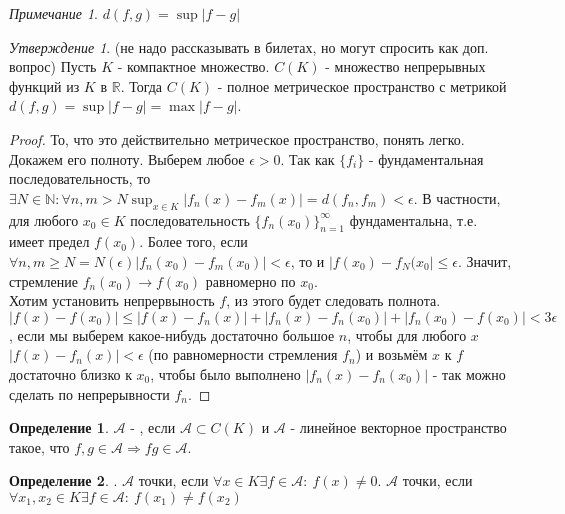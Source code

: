 \documentclass[a4paper]{article}
\theoremstyle{indented}
\theoremstyle{definition}
\newtheorem{defn}{Определение}
\theoremstyle{remark}
\newtheorem{remark}{Примечание}
\newtheorem{stat}{Утверждение}
\DeclareMathOperator{\ra}{\rightarrow}
\begin{document}
\begin{remark}
    $d(f,g) = \sup|f-g|$
\end{remark}

\begin{stat}
    (не надо рассказывать в билетах, но могут спросить как доп. вопрос) Пусть $K$ - компактное множество. $C(K)$ - множество непрерывных функций из $K$ в $\mathbb{R}$. Тогда $C(K)$ - полное метрическое пространство с метрикой $d(f,g) = \sup|f-g|=\max|f-g|$.
\end{stat}
\begin{proof}
    То, что это действительно метрическое пространство, понять легко. Докажем его полноту. Выберем любое $\epsilon > 0$. Так как $\{f_i\}$ - фундаментальная последовательность, то $ \exists N \in \mathbb{N} : \forall n, m>N \sup_{x \in K} |f_n(x)-f_m(x)| = d(f_n, f_m)<\epsilon$. В частности, для любого $x_0 \in K$ последовательность $\{f_n(x_0)\}_{n=1}^{\infty}$ фундаментальна, т.е. имеет предел $f(x_0)$. Более того, если $\forall n, m \geq N=N(\epsilon) |f_n(x_0)-f_m(x_0)|<\epsilon$, то и $|f(x_0)-f_N(x_0| \leq \epsilon$. Значит, стремление $f_n(x_0) \ra f(x_0)$ равномерно по $x_0$. 
    \\
    Хотим установить непрервыность $f$, из этого будет следовать полнота.  $|f(x)-f(x_0)| \leq |f(x)-f_n(x)|+|f_n(x)-f_n(x_0)|+|f_n(x_0)-f(x_0)| < 3\epsilon$, если мы выберем какое-нибудь достаточно большое $n$, чтобы для любого $x$ $|f(x)-f_n(x)| < \epsilon$ (по равномерности стремления $f_n$) и возьмём $x$ к $f$ достаточно близко к $x_0$, чтобы было выполнено $|f_n(x)-f_n(x_0)|$ - так можно сделать по непрерывности $f_n$.
\end{proof}

\begin{defn}
    $\mathcal{A}$ - ,
    если $\mathcal{A} \subset C(K)$ и $\mathcal{A}$ - линейное векторное 
    пространство такое, что $f,g \in \mathcal{A} \Rightarrow fg \in \mathcal{A}$.
\end{defn}


\begin{defn}
    . 
    $\mathcal{A}$  точки, если
    $\forall x \in K \exists f \in \mathcal{A}: \ f(x)\not=0$. $\mathcal{A}$  точки, если
    $\forall x_1, x_2 \in K \exists f \in \mathcal{A}: \ f(x_1)\not=f(x_2)$
\end{defn}
\end{document}
